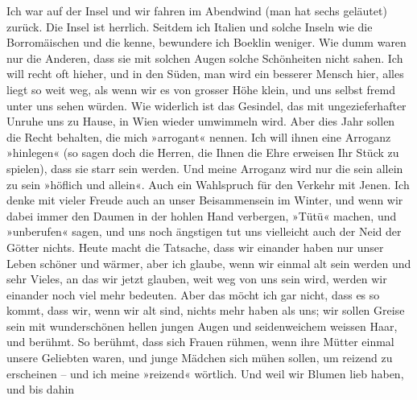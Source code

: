 \pstart
           Ich war auf der Insel und wir fahren im Abendwind (man hat sechs geläutet) zurück.
               Die Insel ist herrlich. Seitdem ich Italien und
               solche Inseln wie die Borromäischen und die
               kenne, bewundere ich Boeklin weniger. Wie dumm
               waren nur die Anderen, dass sie mit solchen Augen solche Schönheiten nicht sahen. Ich
               will recht oft hieher, und in den Süden, man wird ein besserer Mensch hier, alles
               liegt so weit weg, als wenn wir es von grosser Höhe klein, und uns selbst fremd unter
               uns sehen würden. {\pb}Wie widerlich ist das Gesindel, das
               mit ungezieferhafter Unruhe uns zu Hause, in Wien
               wieder umwimmeln wird. Aber dies Jahr sollen die Recht behalten, die mich »arrogant«
               nennen. Ich will ihnen eine Arroganz »hinlegen« (so sagen doch die Herren, die Ihnen
               die Ehre erweisen Ihr Stück zu
               spielen), dass sie starr sein werden. Und meine Arroganz wird nur die sein allein zu
               sein »höflich und allein«. Auch ein Wahlspruch für den Verkehr mit Jenen. Ich denke
               mit vieler Freude auch an unser Beisammensein im Winter, und wenn wir dabei immer den
               Daumen in der hohlen Hand verbergen, »Tütü« machen, und »unberufen« sagen, und uns
               noch ängstigen tut uns vielleicht auch der Neid der Götter nichts. Heute macht die
               Tatsache, dass wir einander haben nur unser Leben schöner und wärmer, aber ich
               glaube, wenn wir einmal alt sein werden und sehr Vieles, an das wir jetzt glauben,
               weit weg von uns sein wird, werden wir einander noch viel mehr bedeuten. Aber das
               möcht ich gar nicht, dass es so kommt, {\pb}dass wir, wenn
               wir alt sind, nichts mehr haben als uns; wir sollen Greise sein mit wunderschönen
               hellen jungen Augen und seidenweichem weissen Haar, und  berühmt. So berühmt, dass sich Frauen rühmen, wenn ihre Mütter einmal
               unsere Geliebten waren, und junge Mädchen sich mühen sollen, um reizend zu erscheinen
               – und ich meine »reizend« wörtlich. Und weil wir Blumen lieb haben, und bis dahin
